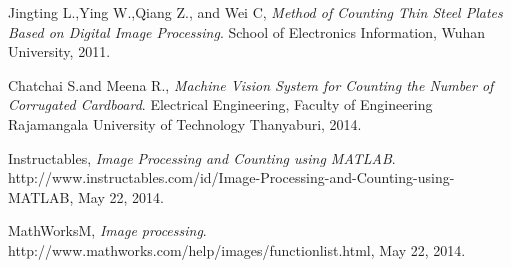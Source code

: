 \documentclass[11pt, oneside]{Thesis} %
\begin{document}
\listoftables %


\mainmatter %

\pagestyle{fancy} %





 

 
 
 

 
 



\backmatter
\begin{thebibliography}{4} %
	Jingting L.,Ying W.,Qiang Z., and Wei C,
	\emph{Method of Counting Thin Steel
		Plates Based on Digital Image Processing}.
	School of Electronics Information, Wuhan University,
	2011.\label{ref:method}
	
	Chatchai S.and Meena R.,
	\emph{Machine Vision System for Counting the Number of
		Corrugated Cardboard}.
	Electrical Engineering, Faculty of Engineering
	Rajamangala University of Technology Thanyaburi,
	2014.\label{ref:machine}
	
	Instructables,
	\emph{Image Processing and Counting using MATLAB}.
	http://www.instructables.com/id/Image-Processing-and-Counting-using-
	MATLAB,
	May 22, 2014.
	
	MathWorksM,
	\emph{Image processing}.
	http://www.mathworks.com/help/images/functionlist.html,
	May 22, 2014.
	
\end{thebibliography}

%
\end{document}
